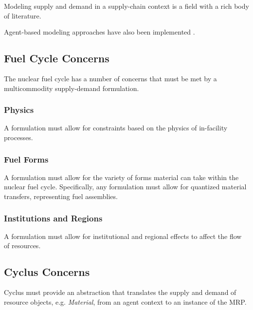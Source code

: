 Modeling supply and demand in a supply-chain context is a field with a rich body
of literature.

Agent-based modeling approaches have also been implemented \cite{julka_agent-based_2002}.

\subsection{Fuel Cycle Concerns}

The nuclear fuel cycle has a number of concerns that must be met by a
multicommodity supply-demand formulation.

\subsubsection{Physics}

A formulation must allow for constraints based on the physics of in-facility processes. 


\subsubsection{Fuel Forms}

A formulation must allow for the variety of forms material can take within the
nuclear fuel cycle. Specifically, any formulation must allow for quantized
material transfers, representing fuel assemblies.


\subsubsection{Institutions and Regions}

A formulation must allow for institutional and regional effects to affect the flow of resources.


\subsection{Cyclus Concerns}

Cyclus must provide an abstraction that translates the supply and demand of
resource objects, e.g. \textit{Material}, from an agent context to an instance
of the MRP. 




